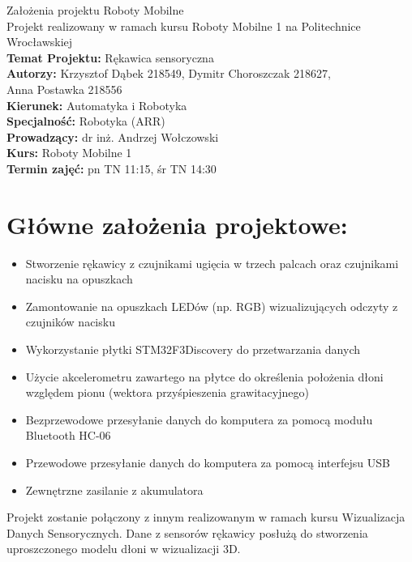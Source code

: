 \documentclass[12pt,a4paper]{article}
\begin{document}
\LARGE\centering Założenia projektu Roboty Mobilne\\
\large\centering Projekt realizowany w ramach kursu Roboty Mobilne 1 na Politechnice Wrocławskiej\\
\vspace{5 mm}
\normalsize\flushleft\textbf{Temat Projektu:} Rękawica sensoryczna\\
\textbf{Autorzy:} Krzysztof Dąbek 218549, Dymitr Choroszczak 218627,\\Anna Postawka 218556\\
\textbf{Kierunek:} Automatyka i Robotyka\\
\textbf{Specjalność:} Robotyka (ARR)\\
\textbf{Prowadzący:} dr inż. Andrzej Wołczowski\\
\textbf{Kurs:} Roboty Mobilne 1\\
\textbf{Termin zajęć:} pn TN 11:15, śr TN 14:30\\
\vspace{5 mm}
\section{Główne założenia projektowe: }\normalsize
\begin{itemize}
\item Stworzenie rękawicy z czujnikami ugięcia w trzech palcach oraz czujnikami nacisku na opuszkach
\item Zamontowanie na opuszkach LEDów (np. RGB) wizualizujących odczyty z czujników nacisku
\item Wykorzystanie płytki STM32F3Discovery do przetwarzania danych
\item Użycie akcelerometru zawartego na płytce do określenia położenia dłoni względem pionu (wektora przyśpieszenia grawitacyjnego)
\item Bezprzewodowe przesyłanie danych do komputera za pomocą modułu Bluetooth HC-06
\item Przewodowe przesyłanie danych do komputera za pomocą interfejsu USB
\item Zewnętrzne zasilanie z akumulatora
\end{itemize}
Projekt zostanie połączony z innym realizowanym w ramach kursu Wizualizacja Danych Sensorycznych. Dane z sensorów rękawicy posłużą do stworzenia uproszczonego modelu dłoni w wizualizacji 3D.
\end{document}
